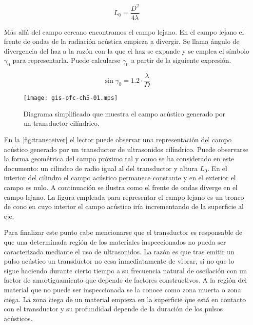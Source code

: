 \begin{equation}
	L_0 = \frac{D^2}{4\lambda}
	\label{eq:nearfield}
\end{equation}

Más allá del campo cercano encontramos el campo lejano. En el campo lejano el frente de ondas de la radiación acústica empieza a divergir. Se llama ángulo de divergencia del haz a la razón con la que el haz se expande y se emplea el símbolo $\gamma_0$ para representarla. Puede calcularse $\gamma_0$ a partir de la siguiente expresión.

\begin{equation}
	\sin{\gamma_0} = 1.2\cdot\frac{\lambda}{D}
	\label{eq:Adivergence}
\end{equation}

\begin{figure}
	\begin{center}
		\texttt{[image: gis-pfc-ch5-01.mps]}
	\end{center}
	\caption[Campo acústico generado por un transductor cilíndrico]{Diagrama simplificado que muestra el campo acústico generado por un transductor cilíndrico.}
	\label{fig:transceiver}
\end{figure}

En la \vref{fig:transceiver} el lector puede observar una representación del campo acústico generado por un transductor de ultrasonidos cilíndrico. Puede observarse la forma geométrica del campo próximo tal y como se ha considerado en este documento: un cilindro de radio igual al del transductor y altura $L_0$. En el interior del cilindro el campo acústico permanece constante y en el exterior el campo es nulo. A continuación se ilustra como el frente de ondas diverge en el campo lejano. La figura empleada para representar el campo lejano es un tronco de cono en cuyo interior el campo acústico iría incrementando de la superficie al eje.\par
Para finalizar este punto cabe mencionarse que el transductor es responsable de que una determinada región de los materiales inspeccionados no pueda ser caracterizada mediante el uso de ultrasonidos. La razón es que tras emitir un pulso acústico un transductor no cesa inmediatamente de vibrar, si no que lo sigue haciendo durante cierto tiempo a su frecuencia natural de oscilación con un factor de amortiguamiento que depende de factores constructivos. A la región del material que no puede ser inspeccionada se la conoce como zona muerta o zona ciega. La zona ciega de un material empieza en la superficie que está en contacto con el transductor y su profundidad depende de la duración de los pulsos acústicos.


